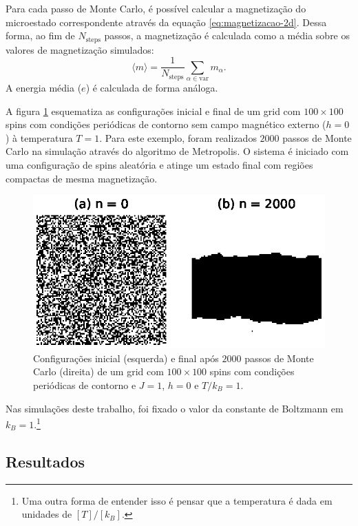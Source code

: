 Para cada passo de Monte Carlo, é possível calcular a magnetização do microestado correspondente através da equação \ref{eq:magnetizacao-2d}. Dessa forma, ao fim de $N_{\text{steps}}$ passos, a magnetização é calculada como a média sobre os valores de magnetização simulados:
\begin{equation}\label{eq:magnetizacao-simulacao}
\langle m \rangle = \frac{1}{N_{\text{steps}}} \sum _{\alpha \in \text{var}} m_{\alpha}\text{.}
\end{equation}
A energia média ($e$) é calculada de forma análoga.

A figura \ref{fig:evolucao-grid-100x100} esquematiza as configurações inicial e final de um grid com $100 \times 100$ spins com condições periódicas de contorno sem campo magnético externo ($h = 0$) à temperatura $T = 1$. Para este exemplo, foram realizados $2000$ passos de Monte Carlo na simulação através do algoritmo de Metropolis. O sistema é iniciado com uma configuração de spins aleatória e atinge um estado final com regiões compactas de mesma magnetização.

\begin{figure}[ht]
	\centering
	\includegraphics[scale = 1]{./img/evolucao-grid-100x100}
    \caption{Configurações inicial (esquerda) e final após $2000$ passos de Monte Carlo (direita) de um grid com $100 \times 100$ spins com condições periódicas de contorno e $J = 1$, $h = 0$ e $T/k_B = 1$.}
    \label{fig:evolucao-grid-100x100}
\end{figure}

Nas simulações deste trabalho, foi fixado o valor da constante de Boltzmann em $k_B = 1$.\footnote{Uma outra forma de entender isso é pensar que a temperatura é dada em unidades de $\left[T\right] / \left[k_B\right]$.}

\subsection{Resultados}

